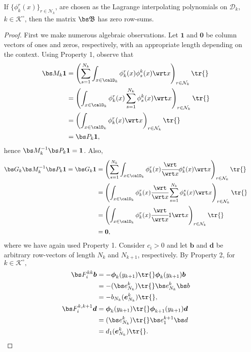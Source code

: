 \begin{lem}
	If \(\{\phi^r_k(x)\}_{r\in\mathcal N_k}\), are chosen as the Lagrange interpolating polynomials on \(\mathcal D_k\), \(k\in\mathcal K^\circ\), then the matrix \( {  {\mathfrak{\bs B}}}\) has zero row-sums. 
\end{lem}
\begin{proof}
	First we make numerous algebraic observations. Let \(\boldsymbol 1\) and \(\boldsymbol 0\) be column vectors of ones and zeros, respectively, with an appropriate length depending on the context. Using Property 1, observe that 
	\begin{align*}
        \bs M_k\boldsymbol 1 &= \left(\sum_{s=1}^{N_k} \int_{x\in\calD_k}\phi^r_k(x)\phi_s^k(x)\wrt x\right)_{r\in\mathcal N_k}\tr{}
        \\&= \left(\int_{x\in\calD_k}\phi^r_k(x)\sum_{s=1}^{N_k} \phi_s^k(x)\wrt x \right)_{r\in\mathcal N_k} \tr{}
        \\&= \left(\int_{x\in\calD_k}\phi^r_k(x)\wrt x\right)_{r\in\mathcal N_k} \tr{}
        \\&= \bs P_k\boldsymbol 1,
	\end{align*}
	hence \(\bs M_k^{-1}\bs P_k\boldsymbol 1=\boldsymbol 1\). Also, 
	\begin{align*}
        \bs G_k\bs M_k^{-1}\bs P_k\boldsymbol 1 = \bs G_k\boldsymbol 1 &= \left(\sum_{s=1}^{N_k} \int_{x\in\calD_k}\phi^r_k(x)\cfrac{\wrt }{\wrt x}\phi_k^s(x)\wrt x\right)_{r\in\mathcal N_k} \tr{}
        \\&= \left(\int_{x\in\calD_k}\phi^r_k(x)\cfrac{\wrt }{\wrt x}\sum_{s=1}^{N_k} \phi_k^s(x)\wrt x \right)_{r\in\mathcal N_k} \tr{}
        \\&= \left(\int_{x\in\calD_k}\phi^r_k(x)\cfrac{\wrt }{\wrt x}1\wrt x\right)_{r\in\mathcal N_k} \tr{}
        \\&= \boldsymbol 0,
	\end{align*}
	where we have again used Property 1. Consider \(c_i>0\) and let \(\boldsymbol b\) and \(\boldsymbol d\) be arbitrary row-vectors of length \(N_k\) and \(N_{k+1}\), respectively. By Property 2, for \(k\in\mathcal K^\circ,\)
	\begin{align*}
        \bs F_i^{kk}\boldsymbol b &= -\boldsymbol \phi_k(y_{k+1})\tr{} \boldsymbol \phi_k(y_{k+1})\boldsymbol b \\&= -(\bs e^k_{N_k})\tr{} \bs e_{N_k}^k\bs b \\&= -b_{N_k}(\boldsymbol e_{N_k}^k)\tr{},
        \\\bs F_i^{k,k+1}\boldsymbol d &= \boldsymbol \phi_{k}(y_{k+1})\tr{} \boldsymbol \phi_{k+1}(y_{k+1})\boldsymbol d \\&= (\bs e^{k}_{N_k})\tr{} \bs e_{1}^{k+1}\bs d \\&= d_{1}(\boldsymbol e_{N_{k}}^{k})\tr{}.

\end{align*}
\end{proof}
